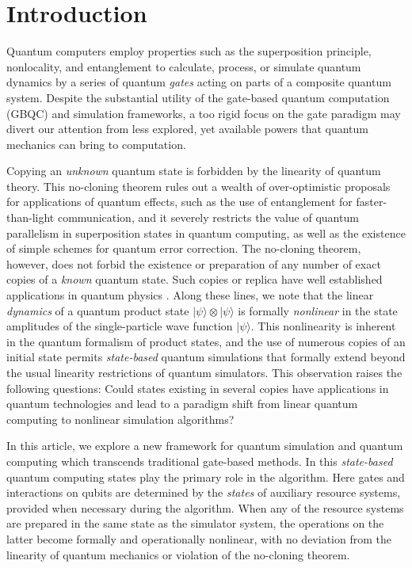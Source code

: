 \documentclass[aps,pra,twocolumn,floatfix,groupedaddress,superscriptaddress,nofootinbib,notitlepage]{revtex4-2}
\newcommand{\ket}[1]{| #1 \rangle}
\begin{document}
\section{Introduction}
\label{sec:intr}

Quantum computers employ properties such as the superposition principle, nonlocality, and entanglement to calculate, process, or simulate quantum dynamics by a series of quantum \textit{gates} acting on parts of a composite quantum system. Despite the substantial utility of the gate-based quantum computation (GBQC) and simulation frameworks, a too rigid focus on the gate paradigm may divert our attention from less explored, yet available powers that quantum mechanics can bring to computation. 

Copying an \textit{unknown} quantum state is forbidden by the linearity of quantum theory. This no-cloning theorem rules out a wealth of over-optimistic proposals for applications of quantum effects, such as the use of entanglement for faster-than-light communication, and it severely restricts the value of quantum parallelism in superposition states in quantum computing, as well as the existence of simple schemes for quantum error correction. The no-cloning theorem, however, does not forbid the existence or preparation of any number of exact copies of a \textit{known} quantum state. Such copies or replica have well established applications in quantum physics \cite{Demler-1, Greiner-2, Bloch-1, Book:Nielsen-Chuang, QT, QPT-1,QPT-2, Huang-Preskill, Nakagawa, metro, Greiner-ent, Ekert-etal, measure-ent}. Along these lines, we note that the linear \textit{dynamics} of a quantum product state $\ket{\psi}\otimes \ket{\psi}$ is formally \textit{nonlinear} in the state amplitudes of the single-particle wave function $\ket{\psi}$. This nonlinearity is inherent in the quantum formalism of product states, and the use of numerous copies of an initial state permits \textit{state-based} quantum simulations that formally extend beyond the usual linearity restrictions of quantum simulators. This observation raises the following questions: Could states existing in several copies have applications in quantum technologies and lead to a paradigm shift from linear quantum computing to nonlinear simulation algorithms? 

In this article, we explore a new framework for quantum simulation and quantum computing which transcends traditional gate-based methods. In this \textit{state-based} quantum computing states play the primary role in the algorithm. Here gates and interactions on qubits are determined by the \textit{states} of auxiliary resource systems, provided when necessary during the algorithm. When any of the resource systems are prepared in the same state as the simulator system, the operations on the latter become formally and operationally nonlinear, with no deviation from the linearity of quantum mechanics or violation of the no-cloning theorem.  
\end{document}
